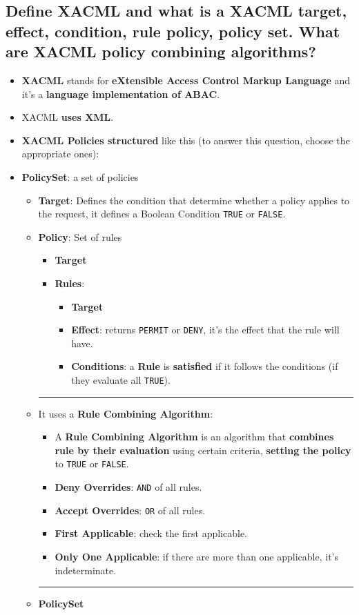 \documentclass[9pt, letterpaper]{article}
\begin{document}
\subsection{Define XACML and what is a XACML target, effect, condition, rule policy, policy set. What are XACML policy combining algorithms?}
\begin{itemize}
	\item \textbf{XACML} stands for \textbf{eXtensible Access Control Markup Language} and it's a \textbf{language implementation of ABAC}.
	\item XACML \textbf{uses XML}.
	\item \textbf{XACML Policies structured} like this (to answer this question, choose the appropriate ones):
	\item \textbf{PolicySet}: a set of policies
	      \begin{itemize}
		      \item \textbf{Target}: Defines the condition that determine whether a policy applies to the request, it defines a Boolean Condition {\tt TRUE} or {\tt FALSE}.
		      \item \textbf{Policy}: Set of rules
		            \begin{itemize}
			            \item \textbf{Target}
			            \item \textbf{Rules}:
			                  \begin{itemize}
				                  \item \textbf{Target}
				                  \item \textbf{Effect}: returns {\tt PERMIT} or {\tt DENY}, it's the effect that the rule will have.
				                  \item \textbf{Conditions}: a \textbf{Rule} is \textbf{satisfied} if it follows the conditions (if they evaluate all {\tt TRUE}).
			                  \end{itemize}
		            \end{itemize}
		            {\noindent\color{gray}\rule{16.5cm}{0.4pt}}
		      \item It uses a \textbf{Rule Combining Algorithm}:
		            \begin{itemize}
			            \item A \textbf{Rule Combining Algorithm} is an algorithm that \textbf{combines rule by their evaluation} using certain criteria, \textbf{setting the policy} to {\tt TRUE} or {\tt FALSE}.
			            \item \textbf{Deny Overrides}: {\tt AND} of all rules.
			            \item \textbf{Accept Overrides}: {\tt OR}  of all rules.
			            \item \textbf{First Applicable}: check the first applicable.
			            \item \textbf{Only One Applicable}: if there are more than one applicable, it's indeterminate.
		            \end{itemize}
		            {\noindent\color{gray}\rule{16.5cm}{0.4pt}}
		      \item \textbf{PolicySet}
	      \end{itemize}
\end{itemize}
\end{document}
